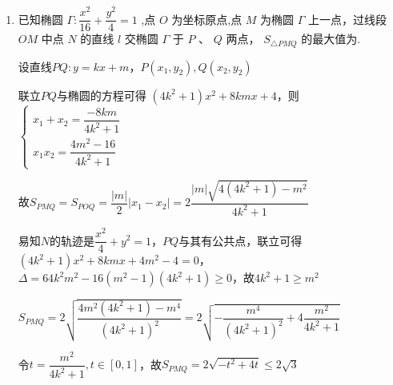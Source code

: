 \begin{enumerate}
\begin{jieda}
\begin{enumerate}
            $\vv{OP} \cdot  \vv{OM} = {x}_{1}{x}_{2} + {y}_{1}{y}_{2} = \left( {1 + {k}^{2}}\right) {x}_{1}{x}_{2} + kb({x}_{1} + {x}_{2}) + {b}^{2} = \dfrac{\left( {1+{k}^{2}}\right) \left( {4{b}^{2} - 4}\right) - (kb) \cdot  (8kb) + b^2(1+4k^2) }{1 + 4k^2}  = \dfrac{5{b}^{2} - 4{k}^{2} - 4}{1 + 4k^2} = 0$. 即证 ${OP}\bot {OM}$.

            \item 根据对称性可知$S_{\triangle PMN} = 2S_{\triangle POM} = |x_1y_2-x_2y_1| = |b| \cdot |x_1-x_2| = \dfrac{|b|}{1+4k^2} \cdot \sqrt{64k^2b^2 - 16(b^2 - 1)(1+4k^2)} = \dfrac{4|b|}{1+4k^2}\cdot \sqrt{1+4k^2-b^2} = \dfrac{4\sqrt{b^2 (4b^2-3)}}{5b^2-3} \geq \dfrac{8}{5}$
        \end{enumerate}
    \end{jieda}
    \item 已知椭圆 $\Gamma  : \dfrac{{x}^{2}}{16} + \dfrac{{y}^{2}}{4} = 1$ ,点 $O$ 为坐标原点,点 $M$ 为椭圆 $\Gamma$ 上一点，过线段 ${OM}$ 中点 $N$ 的直线 $l$ 交椭圆 $\Gamma$ 于 $P$ 、 $Q$ 两点， ${S}_{\bigtriangleup {PMQ}}$ 的最大值为.
    \begin{jieda}
        设直线$PQ: y = kx + m$，$P(x_1, y_2), Q(x_2, y_2)$

        联立$PQ$与椭圆的方程可得 $\left( {4{k}^{2} + 1}\right) {x^2} + {8kmx} + 4$，则 $\left\{ \begin{array}{l}
            {x}_{1} + {x}_{2} = \dfrac{-{8km}}{4{k}^{2} + 1} \\
            {x}_{1}{x}_{2} = \dfrac{4{m}^{2} - {16}}{4{k}^{2} + 1}
        \end{array} \right.$
    
        故$S_{PMQ} = S_{POQ} = \dfrac{\left| m\right| }{2}\left| {{x}_{1} - {x}_{2}}\right| = 2\dfrac{\left| m\right| \sqrt{4\left( {4{k}^{2} + 1}\right)  - {m}^{2}}}{4{k}^{2} + 1}$

        易知$N$的轨迹是$\dfrac{{x}^{2}}{4} + {y}^{2} = 1$，$PQ$与其有公共点，联立可得$(4k^2+1)x^2+8kmx+4m^2-4 = 0$，$\Delta = 64k^2m^2 - 16(m^2 - 1)(4k^2+1) \geq 0$，故$4k^2+1 \geq m^2$

        $S_{PMQ} = 2\sqrt{\dfrac{4{m}^{2}\left( {4{k}^{2} + 1}\right)  - {m}^{4}}{{\left( 4{k}^{2} + 1\right) }^{2}}} = 2\sqrt{-\dfrac{{m}^{4}}{{\left( 4{k}^{2} + 1\right) }^{2}} + 4\dfrac{{m}^{2}}{4{k}^{2} + 1}}$

        令$t = \dfrac{{m}^{2}}{4{k}^{2} + 1}, t \in [0, 1]$，故$S_{PMQ} = 2\sqrt{-t^2+4t} \leq 2\sqrt{3}$
    \end{jieda}
\end{enumerate}

